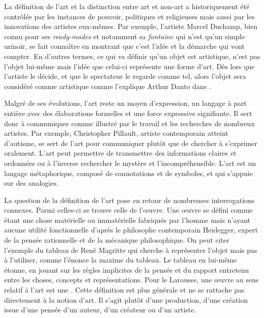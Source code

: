 \documentclass[12pt]{article} %
\begin{document}
La définition de l'art et la distinction entre art et non-art a historiquement été contrôlée par les instances de pouvoir, politiques et religieuses mais aussi par les innovations des artistes eux-mêmes. Par exemple, l'artiste Marcel Duchamp, bien connu pour ses \textit{ready-mades} et notamment sa \textit{fontaine} qui n'est qu'un simple urinoir, se fait connaître en montrant que c'est l'idée et la démarche qui vont compter. En d'autres termes, ce qui va définir qu'un objet est artistique, n'est pas l'objet lui-même mais l'idée que celui-ci représente une forme d'art. Dès lors que l'artiste le décide, et que le spectateur le regarde comme tel, alors l'objet sera considéré comme artistique comme l'explique Arthur Danto dans  \cite{ADanto1989}. 

Malgré de ses évolutions, l'art reste un moyen d'expression, un langage à part entière avec des élaborations formelles et une force expressive signifiante. Il sert donc à communiquer comme illustré par le travail et les recherches de nombreux artistes. Par exemple, Christopher Pillault, artiste contemporain atteint d'autisme, se sert de l'art pour communiquer plutôt que de chercher à s'exprimer oralement. L'art peut permettre de transmettre des informations claires et ordonnées ou à l'inverse rechercher le mystère et l'incompréhensible. L'art est un langage métaphorique, composé de connotations et de symboles, et qui s'appuie sur des analogies. 

La question de la définition de l'art pose en retour de nombreuses interrogations connexes. Parmi celles-ci se trouve celle de l'œuvre. Une œuvre se défini comme étant une chose matérielle ou immatérielle fabriquée par l'homme mais n'ayant aucune utilité fonctionnelle d'après le philosophe contemporain Heidegger, expert de la pensée rationnelle et de la mécanique philosophique. On peut citer l'exemple du tableau de René Magritte  qui cherche à représenter l'objet mais pas à l'utiliser, comme l'énonce la maxime  du tableau\cite{RMAgritte1929}. Le tableau en lui-même étonne, en jouant sur les règles implicites de la pensée et du rapport entretenu entre les choses, concepts et représentations. Pour le Larousse, une œuvre au sens relatif à l'art est une  \cite{LarousseOnline-oeuvre}. Cette définition est plus générale et ne se rattache pas directement à la notion d'art. Il s'agit plutôt d'une production, d'une création issue d'une pensée d'un auteur, d'un créateur ou d'un artiste.  
\end{document}
